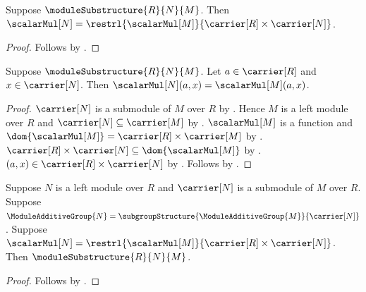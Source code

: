 \begin{proposition}\label{module_substructure_scalar_graph}
    Suppose $\moduleSubstructure{R}{N}{M}$.
    Then $\scalarMul[N]
        =\restrl{\scalarMul[M]}{
            \carrier[R]\times\carrier[N]}$.
\end{proposition}
\begin{proof}
    Follows by .
\end{proof}

\begin{proposition}\label{module_substructure_scalar_apply}
    Suppose $\moduleSubstructure{R}{N}{M}$.
    Let $a\in\carrier[R]$ and $x\in\carrier[N]$.
    Then $\scalarMul[N](a,x)=\scalarMul[M](a,x)$.
\end{proposition}
\begin{proof}
    $\carrier[N]$ is a submodule of $M$ over $R$ by
        .
    Hence $M$ is a left module over $R$ and
        $\carrier[N]\subseteq\carrier[M]$ by
        .
    $\scalarMul[M]$ is a function and
        $\dom{\scalarMul[M]}
            =\carrier[R]\times\carrier[M]$ by
        .
    $\carrier[R]\times\carrier[N]
        \subseteq\dom{\scalarMul[M]}$ by
        .
    $(a,x)\in\carrier[R]\times\carrier[N]$ by
        .
    Follows by
        .
\end{proof}

\begin{proposition}\label{module_substructure_intro}
    Suppose $N$ is a left module over $R$ and
        $\carrier[N]$ is a submodule of $M$ over $R$.
    Suppose $\ModuleAdditiveGroup{N}
        =\subgroupStructure{\ModuleAdditiveGroup{M}}{\carrier[N]}$.
    Suppose $\scalarMul[N]
        =\restrl{\scalarMul[M]}{
            \carrier[R]\times\carrier[N]}$.
    Then $\moduleSubstructure{R}{N}{M}$.
\end{proposition}
\begin{proof}
    Follows by .
\end{proof}

